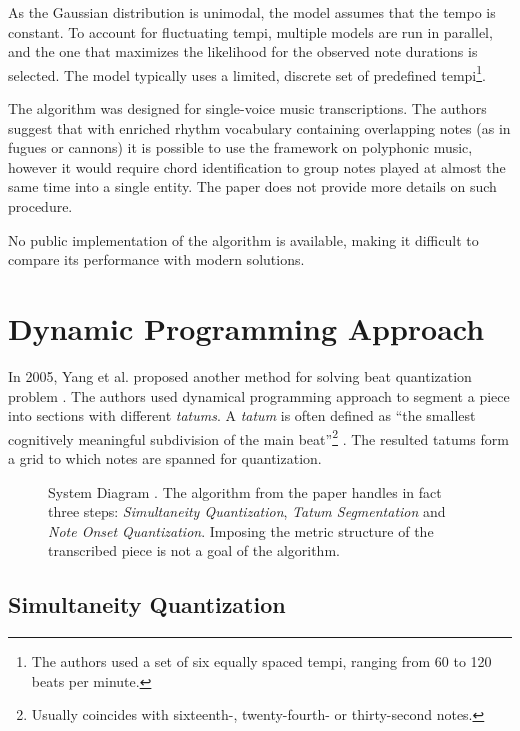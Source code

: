As the Gaussian distribution is unimodal, the model assumes that the tempo is constant. To account for fluctuating tempi, multiple models are run in parallel, and the one that maximizes the likelihood for the observed note durations is selected. The model typically uses a limited, discrete set of predefined tempi\footnote{The authors used a set of six equally spaced tempi, ranging from 60 to 120 beats per minute.}.

The algorithm was designed for single-voice music transcriptions. The authors suggest that with enriched rhythm vocabulary containing overlapping notes (as in fugues or cannons) it is possible to use the framework on polyphonic music, however it would require chord identification to group notes played at almost the same time into a single entity. The paper does not provide more details on such procedure.

No public implementation of the algorithm is available, making it difficult to compare its performance with modern solutions.

\section{Dynamic Programming Approach}

In 2005, Yang et al. proposed another method for solving beat quantization problem \cite{Yang2005}. The authors used dynamical programming approach to segment a piece into sections with different \emph{tatums}. A \emph{tatum} is often defined as ``the smallest cognitively meaningful
subdivision of the main beat''\footnote{Usually coincides with sixteenth-, twenty-fourth- or thirty-second notes.} \cite{Iyer1997}. The resulted tatums form a grid to which notes are spanned for quantization.

\begin{figure}[!ht]
\centering

\caption[System Diagram]{System Diagram \cite{Yang2005}. The algorithm from the paper handles in fact three steps: \emph{Simultaneity Quantization}, \emph{Tatum Segmentation} and \emph{Note Onset Quantization}. Imposing the metric structure of the transcribed piece is not a goal of the algorithm.}
\end{figure}

\subsection{Simultaneity Quantization}

